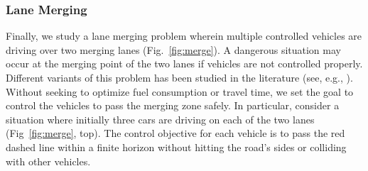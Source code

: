 %
%




\subsubsection{Lane Merging}
Finally, we study a lane merging problem wherein multiple controlled vehicles are driving over two merging lanes (Fig.~\ref{fig:merge}). A dangerous situation may occur at the merging point of the two lanes if vehicles are not controlled properly. Different variants of this problem has been studied in the literature (see, e.g., \cite{xiao2019merging,xiao2020merging}). Without seeking to optimize fuel consumption or travel time, we set the goal to control the vehicles to pass the merging zone safely. In particular, consider a situation where initially three cars are driving on each of the two lanes (Fig~\ref{fig:merge}, top). The control objective for each vehicle is to pass the red dashed line within a finite horizon without hitting the road's sides or colliding with other vehicles. 

